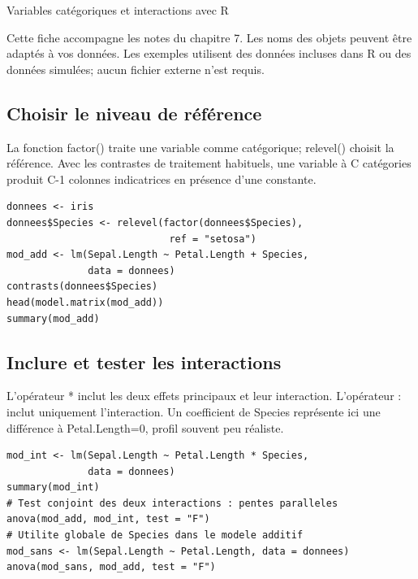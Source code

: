 \documentclass[letterpaper,11pt]{article}
\begin{document}
\begin{center}{\Large Variables catégoriques et interactions avec R}\end{center}
Cette fiche accompagne les notes du chapitre 7. Les noms des objets peuvent être adaptés à vos données. Les exemples utilisent des données incluses dans R ou des données simulées; aucun fichier externe n’est requis.

\par\medskip\noindent\begin{minipage}{\linewidth}
\subsection*{Choisir le niveau de référence}
La fonction factor() traite une variable comme catégorique; relevel() choisit la référence. Avec les contrastes de traitement habituels, une variable à C catégories produit C-1 colonnes indicatrices en présence d'une constante.
\begin{Verbatim}
donnees <- iris
donnees$Species <- relevel(factor(donnees$Species),
                            ref = "setosa")
mod_add <- lm(Sepal.Length ~ Petal.Length + Species,
              data = donnees)
contrasts(donnees$Species)
head(model.matrix(mod_add))
summary(mod_add)
\end{Verbatim}

\end{minipage}\par
\par\medskip\noindent\begin{minipage}{\linewidth}
\subsection*{Inclure et tester les interactions}
L'opérateur * inclut les deux effets principaux et leur interaction. L'opérateur : inclut uniquement l'interaction. Un coefficient de Species représente ici une différence à Petal.Length=0, profil souvent peu réaliste.
\begin{Verbatim}
mod_int <- lm(Sepal.Length ~ Petal.Length * Species,
              data = donnees)
summary(mod_int)
# Test conjoint des deux interactions : pentes paralleles
anova(mod_add, mod_int, test = "F")
# Utilite globale de Species dans le modele additif
mod_sans <- lm(Sepal.Length ~ Petal.Length, data = donnees)
anova(mod_sans, mod_add, test = "F")
\end{Verbatim}

\end{minipage}\par
\end{document}
